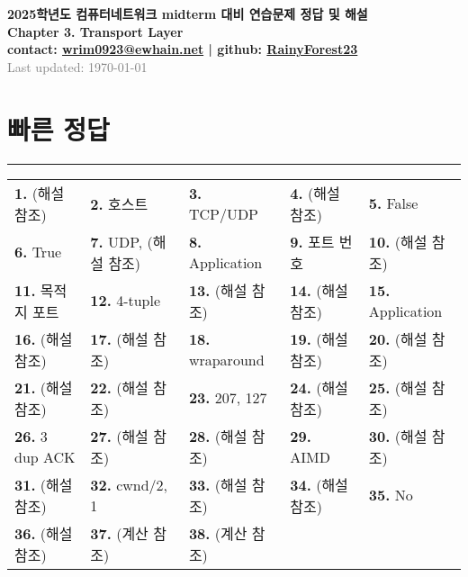 \documentclass[a4paper, 10pt]{article}
\begin{document}
\begin{center}
  \Large\textbf{2025학년도 컴퓨터네트워크 midterm 대비 연습문제 정답 및 해설}\\[8pt]
  \large\textbf{Chapter 3. Transport Layer}\\[5pt]
  \small\textbf{contact: \href{mailto:wrim0923@ewhain.net}{wrim0923@ewhain.net} | github: \href{https://github.com/RainyForest23}{RainyForest23}}\\[5pt]
  \small\textcolor{gray}{Last updated: \today}
\end{center}

\vspace{1cm}

\section*{빠른 정답}
\noindent\rule{\textwidth}{0.6pt}
\begin{center}
\renewcommand{\arraystretch}{1.4}
\begin{tabular}{*{5}{p{}}}
\toprule
\textbf{1.} (해설 참조) & \textbf{2.} 호스트 & \textbf{3.} TCP/UDP & \textbf{4.} (해설 참조) & \textbf{5.} False \\
\textbf{6.} True & \textbf{7.} UDP, (해설 참조) & \textbf{8.} Application & \textbf{9.} 포트 번호 & \textbf{10.} (해설 참조) \\
\textbf{11.} 목적지 포트 & \textbf{12.} 4-tuple & \textbf{13.} (해설 참조) & \textbf{14.} (해설 참조) & \textbf{15.} Application \\
\textbf{16.} (해설 참조) & \textbf{17.} (해설 참조) & \textbf{18.} wraparound & \textbf{19.} (해설 참조) & \textbf{20.} (해설 참조) \\
\textbf{21.} (해설 참조) & \textbf{22.} (해설 참조) & \textbf{23.} 207, 127 & \textbf{24.} (해설 참조) & \textbf{25.} (해설 참조) \\
\textbf{26.} 3 dup ACK & \textbf{27.} (해설 참조) & \textbf{28.} (해설 참조) & \textbf{29.} AIMD & \textbf{30.} (해설 참조) \\
\textbf{31.} (해설 참조) & \textbf{32.} cwnd/2, 1 & \textbf{33.} (해설 참조) & \textbf{34.} (해설 참조) & \textbf{35.} No \\
\textbf{36.} (해설 참조) & \textbf{37.} (계산 참조) & \textbf{38.} (계산 참조) &  &  \\
\bottomrule
\end{tabular}
\end{center}

\newpage
\end{document}
